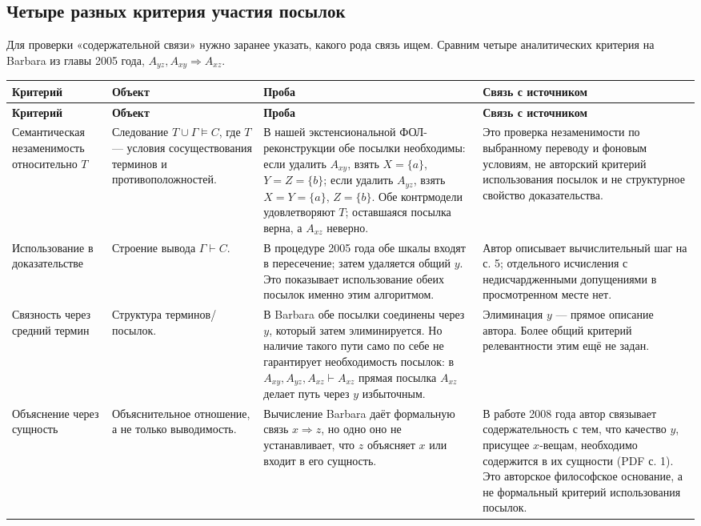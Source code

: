 \documentclass[12pt,a4paper]{article}
\begin{document}
\subsection{Четыре разных критерия участия посылок}

Для проверки «содержательной связи» нужно заранее указать, какого рода связь ищем. Сравним четыре аналитических критерия на Barbara из главы 2005 года, \(A_{yz},A_{xy}\Rightarrow A_{xz}\).

\begin{longtable}{P{.18\linewidth}P{.18\linewidth}P{.32\linewidth}P{.24\linewidth}}
\toprule
\textbf{Критерий} & \textbf{Объект} & \textbf{Проба} & \textbf{Связь с источником} \\
\midrule
\endfirsthead
\toprule
\textbf{Критерий} & \textbf{Объект} & \textbf{Проба} & \textbf{Связь с источником} \\
\midrule
\endhead
Семантическая незаменимость относительно \(T\) & Следование \(T\cup\Gamma\models C\), где \(T\) — условия сосуществования терминов и противоположностей. & В нашей экстенсиональной ФОЛ-реконструкции обе посылки необходимы: если удалить \(A_{xy}\), взять \(X=\{a\}\), \(Y=Z=\{b\}\); если удалить \(A_{yz}\), взять \(X=Y=\{a\}\), \(Z=\{b\}\). Обе контрмодели удовлетворяют \(T\); оставшаяся посылка верна, а \(A_{xz}\) неверно. & Это проверка незаменимости по выбранному переводу и фоновым условиям, не авторский критерий использования посылок и не структурное свойство доказательства. \\
Использование в доказательстве & Строение вывода \(\Gamma\vdash C\). & В процедуре 2005 года обе шкалы входят в пересечение; затем удаляется общий \(y\). Это показывает использование обеих посылок именно этим алгоритмом. & Автор описывает вычислительный шаг на с. 5; отдельного исчисления с недисчардженными допущениями в просмотренном месте нет. \\
Связность через средний термин & Структура терминов/посылок. & В Barbara обе посылки соединены через \(y\), который затем элиминируется. Но наличие такого пути само по себе не гарантирует необходимость посылок: в \(A_{xy},A_{yz},A_{xz}\vdash A_{xz}\) прямая посылка \(A_{xz}\) делает путь через \(y\) избыточным. & Элиминация \(y\) — прямое описание автора. Более общий критерий релевантности этим ещё не задан. \\
Объяснение через сущность & Объяснительное отношение, а не только выводимость. & Вычисление Barbara даёт формальную связь \(x\Rightarrow z\), но одно оно не устанавливает, что \(z\) объясняет \(x\) или входит в его сущность. & В работе 2008 года автор связывает содержательность с тем, что качество \(y\), присущее \(x\)-вещам, необходимо содержится в их сущности (PDF с. 1). Это авторское философское основание, а не формальный критерий использования посылок. \\
\bottomrule
\end{longtable}
\end{document}
